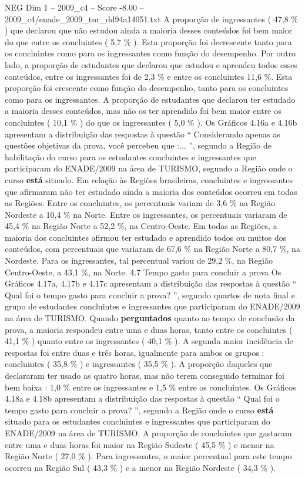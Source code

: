 \begin{textsample}{NEG Dim 1 – 2009\_c4 – Score -8.00 – 2009\_c4/enade\_2009\_tur\_dd94a14051.txt}
A proporção de ingressantes ( 47,8 \% ) que declarou que não estudou ainda a maioria desses conteúdos foi bem maior do que entre os concluintes ( 5,7 \% ).
Esta proporção foi decrescente tanto para os concluintes como para os ingressantes como função do desempenho.
Por outro lado, a proporção de estudantes que declarou que estudou e aprendeu todos esses conteúdos, entre os ingressantes foi de 2,3 \% e entre os concluintes 11,6 \%.
Esta proporção foi crescente como função do desempenho, tanto para os concluintes como para os ingressantes.
A proporção de estudantes que declarou ter estudado a maioria desses conteúdos, mas não os ter aprendido foi bem maior entre os concluintes ( 10,1 \% ) do que os ingressantes ( 5,0 \% ).
Os Gráficos 4.16a e 4.16b apresentam a distribuição das respostas à questão “ Considerando apenas as questões objetivas da prova, você percebeu que :... ”, segundo a Região de habilitação do curso para os estudantes concluintes e ingressantes que participaram do ENADE/2009 na área de TURISMO, segundo a Região onde o curso \textbf{está} situado.
Em relação às Regiões brasileiras, concluintes e ingressantes que afirmaram não ter estudado ainda a maioria dos conteúdos ocorreu em todas as Regiões.
Entre os concluintes, os percentuais variam de 3,6 \% na Região Nordeste a 10,4 \% na Norte.
Entre os ingressantes, os percentuais variaram de 45,4 \% na Região Norte a 52,2 \%, na Centro-Oeste.
Em todas as Regiões, a maioria dos concluintes afirmou ter estudado e aprendido todos ou muitos dos conteúdos, com percentuais que variaram de 67,6 \% na Região Norte a 80,7 \%, na Nordeste.
Para os ingressantes, tal percentual variou de 29,2 \%, na Região Centro-Oeste, a 43,1 \%, na Norte. 4.7 Tempo gasto para concluir a prova Os Gráficos 4.17a, 4.17b e 4.17c apresentam a distribuição das respostas à questão “ Qual foi o tempo gasto para concluir a prova? ”, segundo quartos de nota final e grupo de estudantes concluintes e ingressantes que participaram do ENADE/2009 na área de TURISMO.
Quando \textbf{perguntados} quanto ao tempo de conclusão da prova, a maioria respondeu entre uma e duas horas, tanto entre os concluintes ( 41,1 \% ) quanto entre os ingressantes ( 40,1 \% ).
A segunda maior incidência de respostas foi entre duas e três horas, igualmente para ambos os grupos : concluintes ( 35,8 \% ) e ingressantes ( 35,5 \% ).
A proporção daqueles que declararam ter usado as quatro horas, mas não terem conseguido terminar foi bem baixa : 1,0 \% entre os ingressantes e 1,5 \% entre os concluintes.
Os Gráficos 4.18a e 4.18b apresentam a distribuição das respostas à questão “ Qual foi o tempo gasto para concluir a prova? ”, segundo a Região onde o curso \textbf{está} situado para os estudantes concluintes e ingressantes que participaram do ENADE/2009 na área de TURISMO.
A proporção de concluintes que gastaram entre uma e duas horas foi maior na Região Sudeste ( 45,5 \% ) e menor na Região Norte ( 27,0 \% ).
Para ingressantes, o maior percentual para este tempo ocorreu na Região Sul ( 43,3 \% ) e a menor na Região Nordeste ( 34,3 \% ).

\end{textsample}
